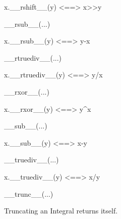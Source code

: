 \documentclass[letterpaper,10pt,english]{sphinxmanual}
\begin{document}
\begin{description}
\begin{description}
\begin{DUlineblock}{0em}
\item[]
\begin{DUlineblock}{\DUlineblockindent}
\item[] x.\_\_rshift\_\_(y) \textless{}==\textgreater{} x\textgreater{}\textgreater{}y
\item[] 
\end{DUlineblock}
\item[] \_\_rsub\_\_(...)
\item[]
\begin{DUlineblock}{\DUlineblockindent}
\item[] x.\_\_rsub\_\_(y) \textless{}==\textgreater{} y-x
\item[] 
\end{DUlineblock}
\item[] \_\_rtruediv\_\_(...)
\item[]
\begin{DUlineblock}{\DUlineblockindent}
\item[] x.\_\_rtruediv\_\_(y) \textless{}==\textgreater{} y/x
\item[] 
\end{DUlineblock}
\item[] \_\_rxor\_\_(...)
\item[]
\begin{DUlineblock}{\DUlineblockindent}
\item[] x.\_\_rxor\_\_(y) \textless{}==\textgreater{} y\textasciicircum{}x
\item[] 
\end{DUlineblock}
\item[] \_\_sub\_\_(...)
\item[]
\begin{DUlineblock}{\DUlineblockindent}
\item[] x.\_\_sub\_\_(y) \textless{}==\textgreater{} x-y
\item[] 
\end{DUlineblock}
\item[] \_\_truediv\_\_(...)
\item[]
\begin{DUlineblock}{\DUlineblockindent}
\item[] x.\_\_truediv\_\_(y) \textless{}==\textgreater{} x/y
\item[] 
\end{DUlineblock}
\item[] \_\_trunc\_\_(...)
\item[]
\begin{DUlineblock}{\DUlineblockindent}
\item[] Truncating an Integral returns itself.

\end{DUlineblock}
\end{DUlineblock}
\end{description}
\end{description}
\end{document}
